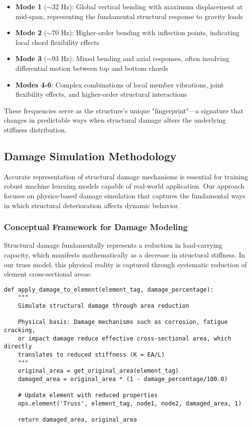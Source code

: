 \documentclass[11pt,a4paper]{article}
\begin{document}
\begin{itemize}
    \item \textbf{Mode 1} ($\sim$32 Hz): Global vertical bending with maximum displacement at mid-span, representing the fundamental structural response to gravity loads
    \item \textbf{Mode 2} ($\sim$70 Hz): Higher-order bending with inflection points, indicating local chord flexibility effects
    \item \textbf{Mode 3} ($\sim$93 Hz): Mixed bending and axial responses, often involving differential motion between top and bottom chords
    \item \textbf{Modes 4-6}: Complex combinations of local member vibrations, joint flexibility effects, and higher-order structural interactions
\end{itemize}

These frequencies serve as the structure's unique "fingerprint"—a signature that changes in predictable ways when structural damage alters the underlying stiffness distribution.

\subsection{Damage Simulation Methodology}

Accurate representation of structural damage mechanisms is essential for training robust machine learning models capable of real-world application. Our approach focuses on physics-based damage simulation that captures the fundamental ways in which structural deterioration affects dynamic behavior.

\subsubsection{Conceptual Framework for Damage Modeling}

Structural damage fundamentally represents a reduction in load-carrying capacity, which manifests mathematically as a decrease in structural stiffness. In our truss model, this physical reality is captured through systematic reduction of element cross-sectional areas:

\begin{lstlisting}[caption={Damage Simulation Implementation}]
def apply_damage_to_element(element_tag, damage_percentage):
    """
    Simulate structural damage through area reduction
    
    Physical basis: Damage mechanisms such as corrosion, fatigue cracking,
    or impact damage reduce effective cross-sectional area, which directly
    translates to reduced stiffness (K = EA/L)
    """
    original_area = get_original_area(element_tag)
    damaged_area = original_area * (1 - damage_percentage/100.0)
    
    # Update element with reduced properties
    ops.element('Truss', element_tag, node1, node2, damaged_area, 1)
    
    return damaged_area, original_area
\end{lstlisting}
\end{document}

